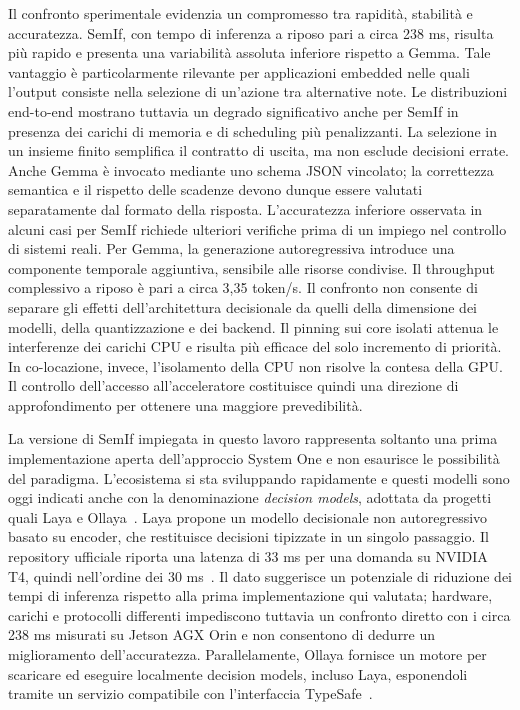 \documentclass[conference]{IEEEtran}
\begin{document}
Il confronto sperimentale evidenzia un compromesso tra rapidità, stabilità e accuratezza. SemIf, con tempo di inferenza a riposo pari a circa 238 ms, risulta più rapido e presenta una variabilità assoluta inferiore rispetto a Gemma. Tale vantaggio è particolarmente rilevante per applicazioni embedded nelle quali l'output consiste nella selezione di un'azione tra alternative note. Le distribuzioni end-to-end mostrano tuttavia un degrado significativo anche per SemIf in presenza dei carichi di memoria e di scheduling più penalizzanti.
La selezione in un insieme finito semplifica il contratto di uscita, ma non esclude decisioni errate. Anche Gemma è invocato mediante uno schema JSON vincolato; la correttezza semantica e il rispetto delle scadenze devono dunque essere valutati separatamente dal formato della risposta. L'accuratezza inferiore osservata in alcuni casi per SemIf richiede ulteriori verifiche prima di un impiego nel controllo di sistemi reali.
Per Gemma, la generazione autoregressiva introduce una componente temporale aggiuntiva, sensibile alle risorse condivise. Il throughput complessivo a riposo è pari a circa 3,35 token/s. Il confronto non consente di separare gli effetti dell'architettura decisionale da quelli della dimensione dei modelli, della quantizzazione e dei backend.
Il pinning sui core isolati attenua le interferenze dei carichi CPU e risulta più efficace del solo incremento di priorità. In co-locazione, invece, l'isolamento della CPU non risolve la contesa della GPU. Il controllo dell'accesso all'acceleratore costituisce quindi una direzione di approfondimento per ottenere una maggiore prevedibilità.

La versione di SemIf impiegata in questo lavoro rappresenta soltanto una prima implementazione aperta dell'approccio System One e non esaurisce le possibilità del paradigma. L'ecosistema si sta sviluppando rapidamente e questi modelli sono oggi indicati anche con la denominazione \emph{decision models}, adottata da progetti quali Laya e Ollaya~\cite{laya,ollaya}. Laya propone un modello decisionale non autoregressivo basato su encoder, che restituisce decisioni tipizzate in un singolo passaggio. Il repository ufficiale riporta una latenza di 33 ms per una domanda su NVIDIA T4, quindi nell'ordine dei 30 ms~\cite{laya}. Il dato suggerisce un potenziale di riduzione dei tempi di inferenza rispetto alla prima implementazione qui valutata; hardware, carichi e protocolli differenti impediscono tuttavia un confronto diretto con i circa 238 ms misurati su Jetson AGX Orin e non consentono di dedurre un miglioramento dell'accuratezza. Parallelamente, Ollaya fornisce un motore per scaricare ed eseguire localmente decision models, incluso Laya, esponendoli tramite un servizio compatibile con l'interfaccia TypeSafe~\cite{ollaya}.
\end{document}
